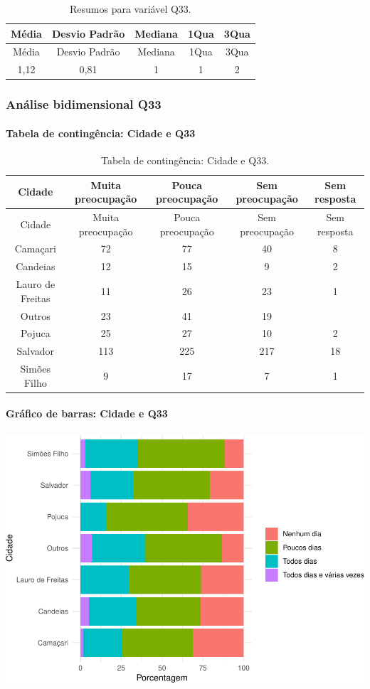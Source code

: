 \documentclass[]{article}
\let\oldparagraph\paragraph
\renewcommand{\paragraph}[1]{\oldparagraph{#1}\mbox{}}
\begin{document}
\begin{longtable}[]{@{}ccccc@{}}
\caption{\label{tab:unnamed-chunk-1133}Resumos para variável Q33.}\tabularnewline
\toprule
Média & Desvio Padrão & Mediana & 1Qua & 3Qua\tabularnewline
\midrule
\endfirsthead
\toprule
Média & Desvio Padrão & Mediana & 1Qua & 3Qua\tabularnewline
\midrule
\endhead
1,12 & 0,81 & 1 & 1 & 2\tabularnewline
\bottomrule
\end{longtable}

\cleardoublepage

\hypertarget{anuxe1lise-bidimensional-q33}{%
\subsubsection{Análise bidimensional Q33}\label{anuxe1lise-bidimensional-q33}}

\hypertarget{tabela-de-continguxeancia-cidade-e-q33}{%
\paragraph{Tabela de contingência: Cidade e Q33}\label{tabela-de-continguxeancia-cidade-e-q33}}

\begin{longtable}[]{@{}ccccc@{}}
\caption{\label{tab:unnamed-chunk-1134}Tabela de contingência: Cidade e Q33.}\tabularnewline
\toprule
Cidade & Muita preocupação & Pouca preocupação & Sem preocupação & Sem resposta\tabularnewline
\midrule
\endfirsthead
\toprule
Cidade & Muita preocupação & Pouca preocupação & Sem preocupação & Sem resposta\tabularnewline
\midrule
\endhead
Camaçari & 72 & 77 & 40 & 8\tabularnewline
Candeias & 12 & 15 & 9 & 2\tabularnewline
Lauro de Freitas & 11 & 26 & 23 & 1\tabularnewline
Outros & 23 & 41 & 19 &\tabularnewline
Pojuca & 25 & 27 & 10 & 2\tabularnewline
Salvador & 113 & 225 & 217 & 18\tabularnewline
Simões Filho & 9 & 17 & 7 & 1\tabularnewline
\bottomrule
\end{longtable}

\hypertarget{gruxe1fico-de-barras-cidade-e-q33}{%
\paragraph{Gráfico de barras: Cidade e Q33}\label{gruxe1fico-de-barras-cidade-e-q33}}

\begin{center}\includegraphics[width=0.75\linewidth]{relatorio_covid19_files/figure-latex/unnamed-chunk-1135-1} \end{center}
\end{document}
